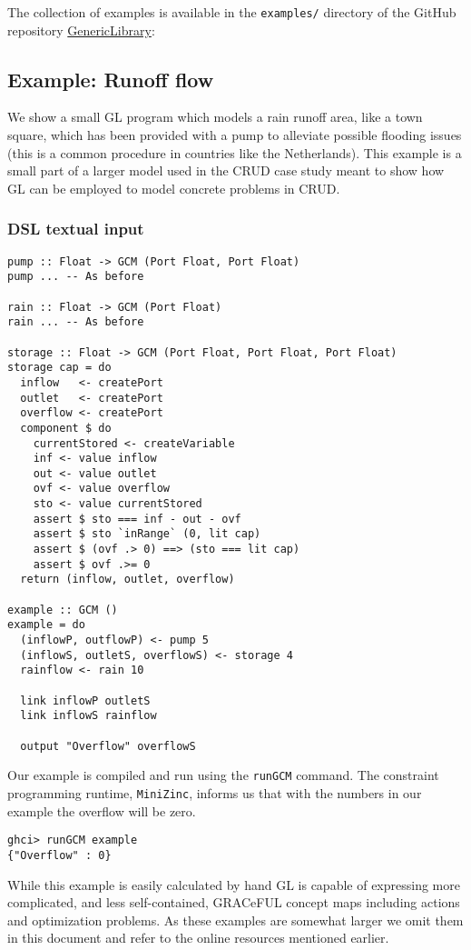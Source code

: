 The collection of examples is available in the \verb+examples/+ directory of the GitHub repository \href{https://github.com/GRACeFUL-project/GenericLibrary}{GenericLibrary}:


\subsection{Example: Runoff flow}
\label{example-runoff-flow}

We show a small GL program which models a rain runoff area, like a
town square, which has been provided with a pump to alleviate possible
flooding issues (this is a common procedure in countries like the
Netherlands).
%
This example is a small part of a larger model used in the CRUD case
study meant to show how GL can be employed to model concrete problems
in CRUD.


\subsubsection{DSL textual input}
\label{example-runoff-flow-dsl-textual-input}


\begin{verbatim}
pump :: Float -> GCM (Port Float, Port Float)
pump ... -- As before

rain :: Float -> GCM (Port Float)
rain ... -- As before

storage :: Float -> GCM (Port Float, Port Float, Port Float)
storage cap = do
  inflow   <- createPort
  outlet   <- createPort
  overflow <- createPort
  component $ do
    currentStored <- createVariable
    inf <- value inflow
    out <- value outlet
    ovf <- value overflow
    sto <- value currentStored
    assert $ sto === inf - out - ovf
    assert $ sto `inRange` (0, lit cap)
    assert $ (ovf .> 0) ==> (sto === lit cap)
    assert $ ovf .>= 0
  return (inflow, outlet, overflow)

example :: GCM ()
example = do
  (inflowP, outflowP) <- pump 5
  (inflowS, outletS, overflowS) <- storage 4
  rainflow <- rain 10

  link inflowP outletS
  link inflowS rainflow

  output "Overflow" overflowS
\end{verbatim}

Our example is compiled and run using the \texttt{runGCM} command.
The constraint programming runtime, \texttt{MiniZinc}, informs us
that with the numbers in our example the overflow will be zero.

\begin{verbatim}
ghci> runGCM example
{"Overflow" : 0}
\end{verbatim}

While this example is easily calculated by hand GL is capable of
expressing more complicated, and less self-contained, GRACeFUL
concept maps including actions and optimization problems. As these
examples are somewhat larger we omit them in this document and
refer to the online resources mentioned earlier.

